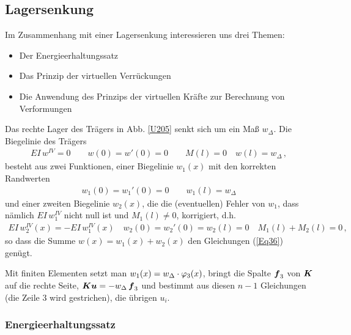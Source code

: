 {{{{%
{\textcolor{sectionTitleBlue}{\section{Lagersenkung}}}
Im Zusammenhang mit einer Lagersenkung interessieren uns drei Themen:\\

\begin{itemize}
  \item Der Energieerhaltungssatz
  \item Das Prinzip der virtuellen Verr\"{u}ckungen
  \item Die Anwendung des Prinzips der virtuellen Kr\"{a}fte zur Berechnung von Verformungen
\end{itemize}

Das rechte Lager des Tr\"{a}gers in Abb. \ref{U205} senkt sich um ein Ma{\ss} $w_{\Delta}$. Die Biegelinie des Tr\"{a}gers
\begin{align}\label{Eq36}
EI\,w^{IV} = 0 \qquad w(0) = w'(0) = 0 \qquad M(l) = 0\quad w(l) = w_{\Delta}\,,
\end{align}
besteht aus zwei Funktionen, einer Biegelinie $w_1(x)$ mit den korrekten Randwerten
\begin{align}
w_1(0) = w_1'(0) = 0 \qquad w_1(l) = w_{\Delta}
\end{align}
und einer zweiten Biegelinie $w_2(x)$, die die (eventuellen) Fehler von $w_1$, dass n\"{a}mlich $EI\,w_1^{IV}$ nicht null ist und $M_1(l) \neq 0$, korrigiert, d.h.
\begin{align}
EI\,w_2^{IV}(x) = - EI\,w_1^{IV}(x) \quad w_2(0) = w_2'(0) = w_2(l) = 0 \quad M_1(l) + M_2(l) = 0\,,
\end{align}
so dass die Summe $w(x) = w_1(x) + w_2(x)$ den Gleichungen (\ref{Eq36}) gen\"{u}gt.

Mit finiten Elementen setzt man  $w_1(x) = w_{\Delta}\cdot \varphi_3(x)$, bringt die Spalte $\mbox{\boldmath $f$}_3$ von $\mbox{\boldmath $K$}$ auf die rechte Seite, $\mbox{\boldmath $K$}\mbox{\boldmath $u$} = - w_{\Delta}\,\mbox{\boldmath $f$}_3$ und bestimmt aus diesen $n-1$ Gleichungen (die Zeile $3$ wird gestrichen), die \"{u}brigen $u_i$.

\vspace{-0.5cm}
{\textcolor{sectionTitleBlue}{\subsubsection*{Energieerhaltungssatz}}}

}}}}
